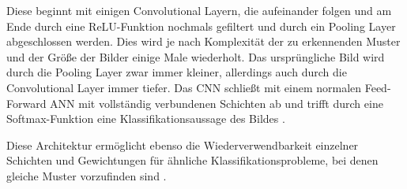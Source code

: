 Diese beginnt mit einigen Convolutional Layern, die aufeinander folgen und am Ende durch eine ReLU-Funktion nochmals gefiltert und durch ein Pooling Layer abgeschlossen werden. Dies wird je nach Komplexität der zu erkennenden Muster und der Größe der Bilder einige Male wiederholt. Das ursprüngliche Bild wird durch die Pooling Layer zwar immer kleiner, allerdings auch durch die Convolutional Layer immer tiefer. Das CNN schließt mit einem normalen Feed-Forward ANN mit vollständig verbundenen Schichten ab und trifft durch eine Softmax-Funktion eine Klassifikationsaussage des Bildes \cite{AurelienGeron.2018}. 

Diese Architektur ermöglicht ebenso die Wiederverwendbarkeit einzelner Schichten und Gewichtungen für ähnliche Klassifikationsprobleme, bei denen gleiche Muster vorzufinden sind \cite{AurelienGeron.2018}.
